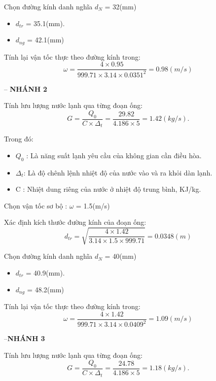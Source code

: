 Chọn đường kính danh nghĩa $d_{N}$ = 32(mm)
\begin{itemize}
	\item $d_{tr}$ = 35.1(mm).
	\item $d_{ng}$ = 42.1(mm)
\end{itemize}

Tính lại vận tốc thực theo đường kính trong:
\begin{equation*}
	\omega = \dfrac{4 \times 0.95 }{999.71 \times 3.14 \times 0.0351^{2}} = 0.98(m/s)
\end{equation*}

-- \textbf{NHÁNH 2}
 
Tính lưu lượng nước lạnh qua từng đoạn ống:
\begin{equation*}
	G = \dfrac{Q_{0}}{C \times \Delta_{t}} =\dfrac{29.82}{4.186 \times 5} = 1.42(kg/s).
\end{equation*}

Trong đó:
\begin{itemize}
	\item $Q_{0}$ : Là năng suất lạnh yêu cầu của không gian cần điều hòa.
	\item $\Delta_{t}$: Là độ chênh lệnh nhiệt độ của nước vào và ra khỏi dàn lạnh.
	\item C : Nhiệt dung riêng của nước ở nhiệt độ trung bình, KJ/kg.
\end{itemize}

Chọn vận tốc sơ bộ : $\omega$ = 1.5(m/s)

Xác định kích thước đường kính của đoạn ống:
\begin{equation*}
	d_{tr} = \sqrt{\dfrac{4 \times 1.42}{3.14 \times 1.5 \times 999.71}} = 0.0348(m)
\end{equation*}

Chọn đường kính danh nghĩa $d_{N}$ = 40(mm)
\begin{itemize}
	\item $d_{tr}$ = 40.9(mm).
	\item $d_{ng}$ = 48.2(mm)
\end{itemize}

Tính lại vận tốc thực theo đường kính trong:
\begin{equation*}
	\omega = \dfrac{4 \times 1.42 }{999.71 \times 3.14 \times 0.0409^{2}} = 1.09(m/s)
\end{equation*}

--\textbf{NHÁNH 3}

Tính lưu lượng nước lạnh qua từng đoạn ống:
\begin{equation*}
	G = \dfrac{Q_{0}}{C \times \Delta_{t}} =\dfrac{24.78}{4.186 \times 5} = 1.18(kg/s).
\end{equation*}

